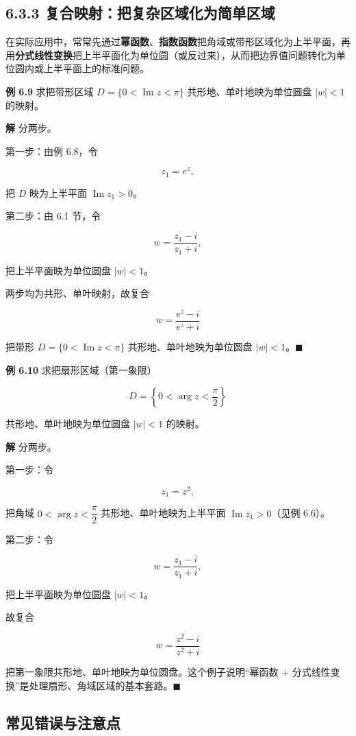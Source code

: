 \subsection{6.3.3
复合映射：把复杂区域化为简单区域}\label{ux590dux5408ux6620ux5c04ux628aux590dux6742ux533aux57dfux5316ux4e3aux7b80ux5355ux533aux57df}

在实际应用中，常常先通过\textbf{幂函数}、\textbf{指数函数}把角域或带形区域化为上半平面，再用\textbf{分式线性变换}把上半平面化为单位圆（或反过来），从而把边界值问题转化为单位圆内或上半平面上的标准问题。

\textbf{例 6.9} 求把带形区域 \(D=\{0<\operatorname{Im}z<\pi\}\)
共形地、单叶地映为单位圆盘 \(|w|<1\) 的映射。

\textbf{解} 分两步。

第一步：由例 6.8，令

\[
z_1=e^{z},
\]

把 \(D\) 映为上半平面 \(\operatorname{Im}z_1>0\)。

第二步：由 6.1 节，令

\[
w=\frac{z_1-i}{z_1+i},
\]

把上半平面映为单位圆盘 \(|w|<1\)。

两步均为共形、单叶映射，故复合

\[
\boxed{\;w=\frac{e^{z}-i}{e^{z}+i}\;}
\]

把带形 \(D=\{0<\operatorname{Im}z<\pi\}\) 共形地、单叶地映为单位圆盘
\(|w|<1\)。\(\blacksquare\)

\textbf{例 6.10} 求把扇形区域（第一象限）

\[
D=\left\{0<\arg z<\frac{\pi}{2}\right\}
\]

共形地、单叶地映为单位圆盘 \(|w|<1\) 的映射。

\textbf{解} 分两步。

第一步：令

\[
z_1=z^{2},
\]

把角域 \(0<\arg z<\dfrac{\pi}{2}\) 共形地、单叶地映为上半平面
\(\operatorname{Im}z_1>0\)（见例 6.6）。

第二步：令

\[
w=\frac{z_1-i}{z_1+i},
\]

把上半平面映为单位圆盘 \(|w|<1\)。

故复合

\[
\boxed{\;w=\frac{z^{2}-i}{z^{2}+i}\;}
\]

把第一象限共形地、单叶地映为单位圆盘。这个例子说明``幂函数 +
分式线性变换''是处理扇形、角域区域的基本套路。\(\blacksquare\)

\subsection{常见错误与注意点}\label{ux5e38ux89c1ux9519ux8befux4e0eux6ce8ux610fux70b9-20}

